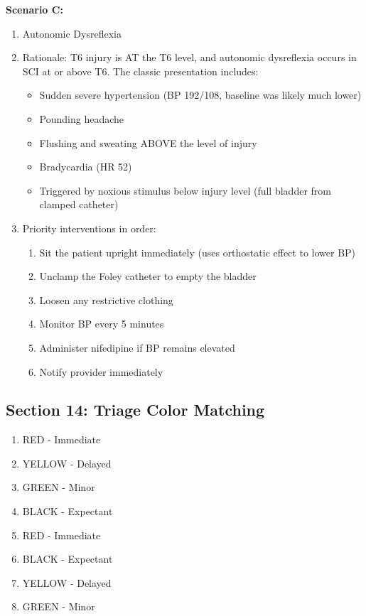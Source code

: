 \documentclass[11pt]{article}
\begin{document}
\textbf{Scenario C:}
\begin{enumerate}
    \item Autonomic Dysreflexia
    
    \item Rationale: T6 injury is AT the T6 level, and autonomic dysreflexia occurs in SCI at or above T6. The classic presentation includes:
    \begin{itemize}
        \item Sudden severe hypertension (BP 192/108, baseline was likely much lower)
        \item Pounding headache
        \item Flushing and sweating ABOVE the level of injury
        \item Bradycardia (HR 52)
        \item Triggered by noxious stimulus below injury level (full bladder from clamped catheter)
    \end{itemize}
    
    \item Priority interventions in order:
    \begin{enumerate}[label=\alph*)]
        \item Sit the patient upright immediately (uses orthostatic effect to lower BP)
        \item Unclamp the Foley catheter to empty the bladder
        \item Loosen any restrictive clothing
        \item Monitor BP every 5 minutes
        \item Administer nifedipine if BP remains elevated
        \item Notify provider immediately
    \end{enumerate}
\end{enumerate}

\subsection*{Section 14: Triage Color Matching}
\begin{enumerate}
    \item RED - Immediate
    \item YELLOW - Delayed
    \item GREEN - Minor
    \item BLACK - Expectant
    \item RED - Immediate
    \item BLACK - Expectant
    \item YELLOW - Delayed
    \item GREEN - Minor
\end{enumerate}
\end{document}
